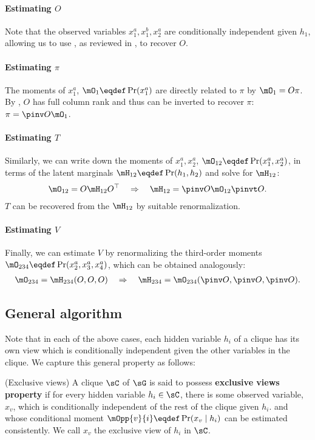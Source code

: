 \paragraph{Estimating $O$}
Note that the observed variables $x^a_1, x^b_1, x^a_2$ are
  conditionally independent given $h_1$, allowing us to use
  \TensorFactorize, as reviewed in , to recover
  $O$.

\paragraph{Estimating $\pi$}
The moments of $x^a_1$, $\mO_1 \eqdef \Pr(x^a_1)$ are directly related to
  $\pi$ by $\mO_1 = O \pi$. 
By , $O$ has full column rank and thus can be
  inverted to recover $\pi$: $\pi = \pinv O \mO_1$.

\paragraph{Estimating $T$}
Similarly, we can write down the moments of $x^a_1, x^a_2$, $\mO_{12}
  \eqdef \Pr(x^a_1, x^a_2)$, in terms of the latent marginals $\mH_{12}
  \eqdef \Pr(h_1, h_2)$ and solve for $\mH_{12}$:
\begin{align*}
\mO_{12} = O \mH_{12} O^\top \quad\Rightarrow\quad
  \mH_{12} = \pinv O \mO_{12} \pinvt O.
\end{align*}
$T$ can be recovered from the $\mH_{12}$ by suitable renormalization.

\paragraph{Estimating $V$}
Finally, we can estimate $V$ by renormalizing the third-order moments $\mO_{234} \eqdef \Pr(x^a_2, x^a_3, x^a_4)$,
which can be obtained analogously:
\begin{align*}
  \mO_{234} = \mH_{234}(O, O, O) \quad\Rightarrow\quad
  \mH_{234} = \mO_{234}(\pinv O, \pinv O, \pinv O).
\end{align*}

\subsection{General algorithm}
\label{sec:directedGeneral}

Note that in each of the above cases,
each hidden variable $h_i$ of a clique has its own view which is conditionally independent
given the other variables in the clique.
We capture this general property as follows:
\begin{property}(Exclusive views)
  \label{prop:exclusive-views}
  A clique $\sC$ of $\sG$ is said to possess \textbf{exclusive views property} if for every hidden variable $h_i \in \sC$,
  there is some observed variable, $x_{v}$, which is conditionally
  independent of the rest of the clique given $h_i$.
  and whose conditional
  moment $\mOpp{v}{i} \eqdef \Pr(x_{v} \mid h_i)$ can be estimated consistently.
We call $x_v$ the exclusive view of $h_i$ in $\sC$.
\end{property}

